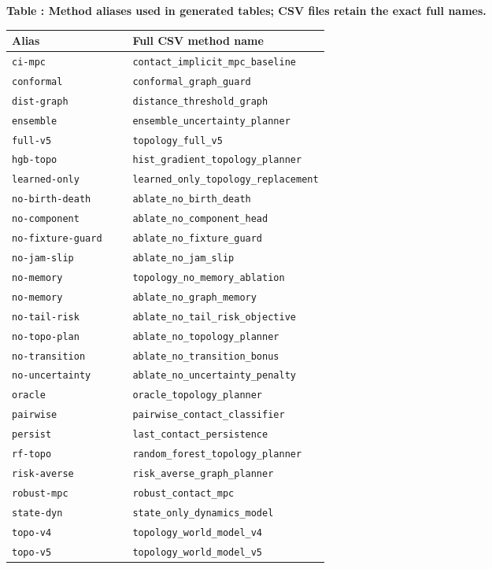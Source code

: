 \documentclass{article}
\begin{document}
\tiny
\begin{center}
\label{tab:aliases}\textbf{Table \thetable: Method aliases used in generated tables; CSV files retain the exact full names.}\\[0.4ex]
\begin{tabular}{lp{0.62\linewidth}}
\toprule
Alias & Full CSV method name \\
\midrule
\texttt{ci-mpc} & \texttt{contact\_implicit\_mpc\_baseline} \\
\texttt{conformal} & \texttt{conformal\_graph\_guard} \\
\texttt{dist-graph} & \texttt{distance\_threshold\_graph} \\
\texttt{ensemble} & \texttt{ensemble\_uncertainty\_planner} \\
\texttt{full-v5} & \texttt{topology\_full\_v5} \\
\texttt{hgb-topo} & \texttt{hist\_gradient\_topology\_planner} \\
\texttt{learned-only} & \texttt{learned\_only\_topology\_replacement} \\
\texttt{no-birth-death} & \texttt{ablate\_no\_birth\_death} \\
\texttt{no-component} & \texttt{ablate\_no\_component\_head} \\
\texttt{no-fixture-guard} & \texttt{ablate\_no\_fixture\_guard} \\
\texttt{no-jam-slip} & \texttt{ablate\_no\_jam\_slip} \\
\texttt{no-memory} & \texttt{topology\_no\_memory\_ablation} \\
\texttt{no-memory} & \texttt{ablate\_no\_graph\_memory} \\
\texttt{no-tail-risk} & \texttt{ablate\_no\_tail\_risk\_objective} \\
\texttt{no-topo-plan} & \texttt{ablate\_no\_topology\_planner} \\
\texttt{no-transition} & \texttt{ablate\_no\_transition\_bonus} \\
\texttt{no-uncertainty} & \texttt{ablate\_no\_uncertainty\_penalty} \\
\texttt{oracle} & \texttt{oracle\_topology\_planner} \\
\texttt{pairwise} & \texttt{pairwise\_contact\_classifier} \\
\texttt{persist} & \texttt{last\_contact\_persistence} \\
\texttt{rf-topo} & \texttt{random\_forest\_topology\_planner} \\
\texttt{risk-averse} & \texttt{risk\_averse\_graph\_planner} \\
\texttt{robust-mpc} & \texttt{robust\_contact\_mpc} \\
\texttt{state-dyn} & \texttt{state\_only\_dynamics\_model} \\
\texttt{topo-v4} & \texttt{topology\_world\_model\_v4} \\
\texttt{topo-v5} & \texttt{topology\_world\_model\_v5} \\
\bottomrule
\end{tabular}
\end{center}
\normalsize
\end{document}
